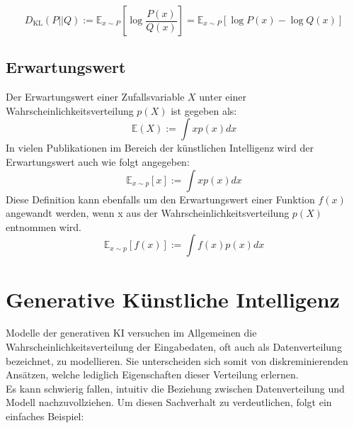 \begin{equation}
D_\text{KL}(P||Q) 
:= \mathbb{E}_{x \sim P} \left [
\log \frac{P(x)} {Q(x)}
\right ]
= \mathbb{E}_{x \sim P} \left [ 
    \log P(x) - \log Q(x)
    \right ]
\end{equation}

\subsection{Erwartungswert}

Der Erwartungswert einer Zufallsvariable $X$ unter einer Wahrscheinlichkeitsverteilung $p(X)$ ist gegeben als: 
\begin{equation}
    \mathbb E(X) := \int x p(x) dx
\end{equation}
In vielen Publikationen im Bereich der künstlichen Intelligenz wird der Erwartungswert auch wie folgt angegeben:
\begin{equation}
    \mathbb E_{x \sim p}[x] := \int x p(x) dx
\end{equation}
Diese Definition kann ebenfalls um den Erwartungswert einer Funktion $f(x)$ angewandt werden, wenn x aus der Wahrscheinlichkeitsverteilung $p(X)$ entnommen wird. 
\begin{equation}
    \mathbb E_{x \sim p}[f(x)] := \int f(x) p(x) dx
\end{equation}



\section{Generative Künstliche Intelligenz}

Modelle der generativen KI versuchen im Allgemeinen die Wahrscheinlichkeitsverteilung der Eingabedaten, oft auch als Datenverteilung bezeichnet, zu modellieren. Sie unterscheiden sich somit von diskreminierenden Ansätzen, welche lediglich Eigenschaften dieser Verteilung erlernen. \\
Es kann schwierig fallen, intuitiv die Beziehung zwischen Datenverteilung und Modell nachzuvollziehen. Um diesen Sachverhalt zu verdeutlichen, folgt ein einfaches Beispiel:

